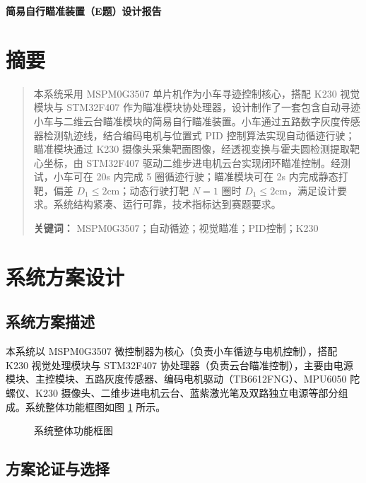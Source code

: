 \documentclass[zihao=-4,fontset=none]{ctexart}
\begin{document}
\begin{center}
    \huge \bfseries 简易自行瞄准装置（E题）设计报告
    \vspace{1cm}
\end{center}

\section*{摘要}
\begin{quote}
    \noindent
    本系统采用 MSPM0G3507 单片机作为小车寻迹控制核心，搭配 K230 视觉模块与 STM32F407 作为瞄准模块协处理器，设计制作了一套包含自动寻迹小车与二维云台瞄准模块的简易自行瞄准装置。小车通过五路数字灰度传感器检测轨迹线，结合编码电机与位置式 PID 控制算法实现自动循迹行驶；瞄准模块通过 K230 摄像头采集靶面图像，经透视变换与霍夫圆检测提取靶心坐标，由 STM32F407 驱动二维步进电机云台实现闭环瞄准控制。经测试，小车可在 20s 内完成 5 圈循迹行驶；瞄准模块可在 2s 内完成静态打靶，偏差 $D_1 \le 2\text{cm}$；动态行驶打靶 $N=1$ 圈时 $D_1 \le 2\text{cm}$，满足设计要求。系统结构紧凑、运行可靠，技术指标达到赛题要求。
    
    \vspace{1cm}
    \noindent
    \textbf{关键词：} MSPM0G3507；自动循迹；视觉瞄准；PID控制；K230
\end{quote}

\newpage
\tableofcontents
\newpage

\section{系统方案设计}

\subsection{系统方案描述}
本系统以 MSPM0G3507 微控制器为核心（负责小车循迹与电机控制），搭配 K230 视觉处理模块与 STM32F407 协处理器（负责云台瞄准控制），主要由电源模块、主控模块、五路灰度传感器、编码电机驱动（TB6612FNG）、MPU6050 陀螺仪、K230 摄像头、二维步进电机云台、蓝紫激光笔及双路独立电源等部分组成。系统整体功能框图如图 \ref{fig:e_block} 所示。

\begin{figure}[H]
    \centering
    \caption{系统整体功能框图}
    \label{fig:e_block}
\end{figure}

\subsection{方案论证与选择}
\end{document}
